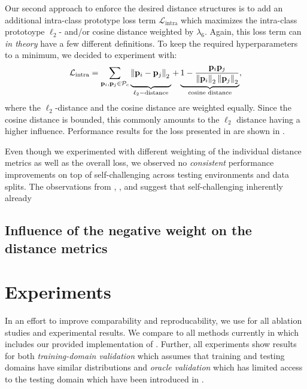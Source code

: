 Our second approach to enforce the desired distance structures is to add an additional intra-class prototype loss term $\mathcal{L}_\mathrm{intra}$ which maximizes the intra-class prototoype $\ell_2$- and/or cosine distance weighted by $\lambda_6$. Again, this loss term can \emph{in theory} have a few different definitions. To keep the required hyperparameters to a minimum, we decided to experiment with:
\begin{equation}
\label{eq:intra_loss}
    \mathcal{L}_\mathrm{intra} = \sum_{\proti_i, \prot \in \prots_c} \underbrace{\left\|\proti_i - \prot  \right\|_2 \vphantom{\frac{\proti_i\prot}{\left\|\proti_i \right\|_2 \left\|\prot \right\|_2}}}_{\ell_2-\text{distance}} + \underbrace{ 1-\frac{\proti_i\prot}{\left\|\proti_i \right\|_2 \left\|\prot \right\|_2}}_{\text{cosine distance}},
\end{equation}
where the $\ell_2$-distance and the cosine distance are weighted equally. Since the cosine distance is bounded, this commonly amounts to the $\ell_2$ distance having a higher influence. Performance results for the loss presented in  are shown in . 

Even though we experimented with different weighting of the individual distance metrics as well as the overall loss, we observed no \emph{consistent} performance improvements on top of self-challenging across testing environments and data splits. The observations from , , and  suggest that self-challenging inherently already 


\subsection{Influence of the negative weight on the distance metrics}


\section{Experiments}
In an effort to improve comparability and reproducability, we use \domainbed \citep{gulrajani2020search} for all ablation studies and experimental results. We compare to all methods currently in \domainbed which includes our provided implementation of \rsc. Further, all experiments show results for both \emph{training-domain validation} which assumes that training and testing domains have similar distributions  and \emph{oracle validation} which has limited access to the testing domain which have been introduced in .

